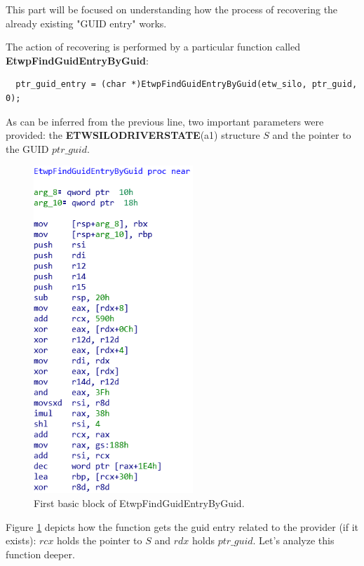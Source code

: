   This part will be focused on understanding how the process of recovering the already existing "GUID entry" works.

  The action of recovering is performed by a particular function called {\bfseries EtwpFindGuidEntryByGuid}:

  \begin{verbatim}
  ptr_guid_entry = (char *)EtwpFindGuidEntryByGuid(etw_silo, ptr_guid, 0);
  \end{verbatim}

  As can be inferred from the previous line, two important parameters were provided: the {\bfseries ETWSILODRIVERSTATE}(a1) structure $S$ and the pointer to the GUID $ptr\_guid$.

  \begin{centering}
  \begin{figure}[H]
    \includegraphics[width=6cm]{images/etwpfindguidguidentrybyguid1.png}
    \caption[]{First basic block of EtwpFindGuidEntryByGuid.}
    \label{fig:EtwpFindGuidEntryByGuid}
  \end{figure}
  \end{centering}

  Figure \ref{fig:EtwpFindGuidEntryByGuid} depicts how the function gets the guid entry related to the provider (if it exists): $rcx$ holds the pointer to $S$ and $rdx$ holds $ptr\_guid$. Let's analyze this function deeper.

